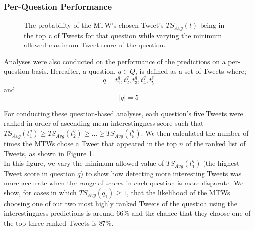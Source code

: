 \subsubsection{Per-Question Performance}
\begin{figure}[h]
\caption{The probability of the MTW's chosen Tweet's $TS_{Avg}(t)$ being in the top \textit{n} of Tweets for that question while varying the minimum allowed maximum Tweet score of the question.}
\label{fig:score-dist}
\end{figure}
Analyses were also conducted on the performance of the predictions on a per-question basis. Hereafter, a question, $q \in Q$, is defined as a set of Tweets where;
\[ q = {t^q_1, t^q_2, t^q_3, t^q_4, t^q_5} \]
and
\[ |q| = 5 \]

For conducting these question-based analyses, each question's five Tweets were ranked in order of ascending mean interestingness score such that $TS_{Avg}(t^q_1) \geq TS_{Avg}(t^q_2) \geq ... \geq TS_{Avg}(t^q_5)$. We then calculated the number of times the MTWs chose a Tweet that appeared in the top $n$ of the ranked list of Tweets, as shown in Figure \ref{fig:score-dist}.\\
In this figure, we vary the minimum allowed value of $TS_{Avg}(t^q_1)$ (the highest Tweet score in question $q$) to show how detecting more interesting Tweets was more accurate when the range of scores in each question is more disparate. We show, for cases in which $TS_{Avg}(q_1) \geq 1$, that the likelihood of the MTWs choosing one of our two most highly ranked Tweets of the question using the interestingness predictions is around 66\% and the chance that they choose one of the top three ranked Tweets is 87\%.

